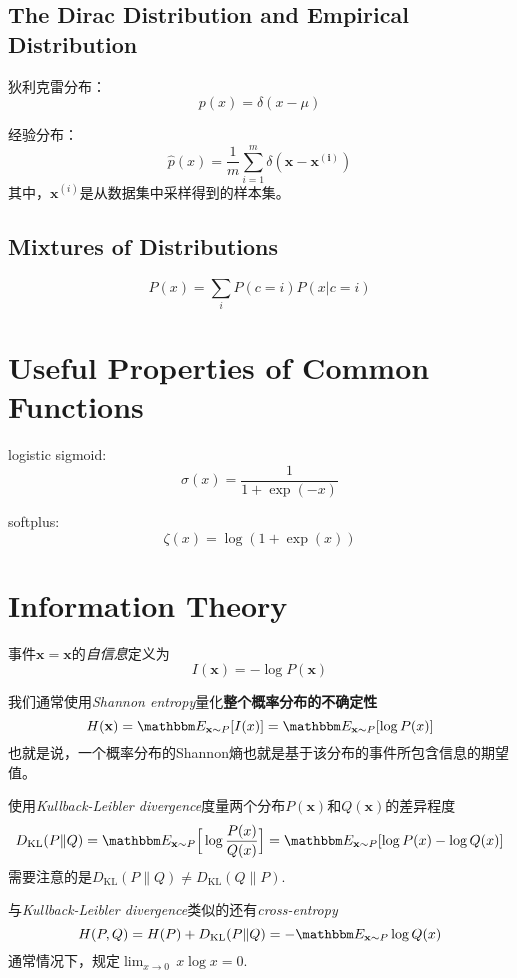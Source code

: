 \subsection{The Dirac Distribution and Empirical Distribution}

狄利克雷分布：
\begin{equation}
p(x)=\delta(x-\mu)
\end{equation}

经验分布：
\begin{equation}
\hat p(x)=\frac{1}{m}\sum_{i=1}^m\delta(\bm{x-x^{(i)}})
\end{equation}
其中，$\bm x^{(i)}$是从数据集中采样得到的样本集。

\subsection{Mixtures of Distributions}

\begin{equation}
P(x)=\sum_iP(c=i)P(x|c=i)
\end{equation}

\section{Useful Properties of Common Functions}

logistic sigmoid:
\begin{equation}
\sigma(x)=\frac{1}{1+\exp(-x)}
\end{equation}

softplus:
\begin{equation}
\zeta(x)=\log(1+\exp(x))
\end{equation}

\setcounter{section}{12}
\section{Information Theory}

事件$\mathbf x =\bm x$的\textit{自信息}定义为
\begin{equation}
I(\bm x)=-\log P(\bm x)
\end{equation}

我们通常使用\textit{Shannon entropy}量化\textbf{整个概率分布的不确定性}
\begin{equation}
    H(\mathbf x)=\mathbbm E_{\mathbf x\sim P}[I(x)]=\mathbbm E_{\mathbf x\sim P}[\log P(x)]
\end{equation}
也就是说，一个概率分布的Shannon熵也就是基于该分布的事件所包含信息的期望值。

使用\textit{Kullback-Leibler divergence}度量两个分布$P(\mathbf x)$和$Q(\mathbf x)$的差异程度
\begin{equation}
D_{\text{KL}}(P\|Q)=\mathbbm E_{\mathbf x\sim P}\Big[\log\frac{P(x)}{Q(x)}\Big]=
    \mathbbm E_{\mathbf x\sim P}[\log P(x)-\log Q(x)]\end{equation}
需要注意的是$D_{\text{KL}}(P\|Q)\ne D_{\text{KL}}(Q\|P)$.

与\textit{Kullback-Leibler divergence}类似的还有\textit{cross-entropy}
\begin{equation}
    H(P,Q)=H(P)+D_{\text{KL}}(P\|Q)=-\mathbbm E_{\mathbf x\sim P}\log Q(x)
\end{equation}
通常情况下，规定$\lim_{x\to 0}\,x\log x=0$.
